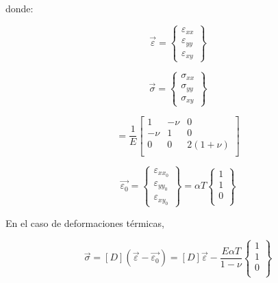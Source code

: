 donde:

\begin{equation}
\vec{\varepsilon} = 
\left\{\begin{matrix}
\varepsilon_{xx} \\ \varepsilon_{yy} \\ \varepsilon_{xy}
\end{matrix}\right\}
\end{equation}

\begin{equation}
\vec{\sigma} = 
\left\{\begin{matrix}
\sigma_{xx} \\ \sigma_{yy} \\ \sigma_{xy}
\end{matrix}\right\}
\end{equation}

\begin{equation}
[C] = \frac{1}{E}
\left[\begin{matrix}
1 & -\nu & 0 \\
-\nu & 1 & 0 \\
0 & 0 & 2(1+\nu) \\
\end{matrix}\right]
\end{equation}

\begin{equation}
\vec{\varepsilon_0} = 
\left\{\begin{matrix}
\varepsilon_{xx_0} \\ \varepsilon_{yy_0} \\ \varepsilon_{xy_0}
\end{matrix}\right\} =
\alpha T 
\left\{\begin{matrix}
1 \\ 1 \\ 0 \\
\end{matrix}\right\}
\end{equation}

En el caso de deformaciones térmicas,

\begin{equation}
\vec{\sigma} = [D] (\vec{\varepsilon} - \vec{\varepsilon_0}) = 
[D] \vec{\varepsilon} - 
\frac{E\alpha T}{1-\nu} 
\left\{\begin{matrix}
1 \\ 1 \\ 0 \\
\end{matrix}\right\}
\end{equation}

